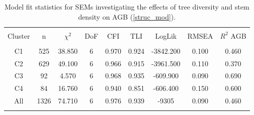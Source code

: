 
\begin{table}[!htbp] \centering 
  \caption{Model fit statistics for SEMs investigating the effects of tree diversity and stem density on AGB (\autoref{struc_mod}).} 
  \label{struc_model_fit_clust_stats} 
\begin{tabular}{@{\extracolsep{0pt}} ccccccccc} 
\\[-1.8ex]\hline 
\hline \\[-1.8ex] 
{Cluster} & {n} & {$\chi^{2}$} & {DoF} & {CFI} & {TLI} & {LogLik} & {RMSEA} & {$R^{2}$ AGB} \\
\hline \\[-1.8ex] 
C1 & 525 & 38.850 & 6 & 0.970 & 0.924 & -3842.200 & 0.100 & 0.460 \\ 
C2 & 629 & 49.100 & 6 & 0.966 & 0.915 & -3961.500 & 0.110 & 0.370 \\ 
C3 & 92 & 4.570 & 6 & 0.968 & 0.935 & -609.900 & 0.090 & 0.690 \\
C4 & 84 & 16.760 & 6 & 0.940 & 0.851 & -606.400 & 0.150 & 0.600 \\ 
All & 1326 & 74.710 & 6 & 0.976 & 0.939 & -9305 & 0.090 & 0.460 \\ 
\hline \\[-1.8ex] 
\end{tabular} 
\end{table} 
